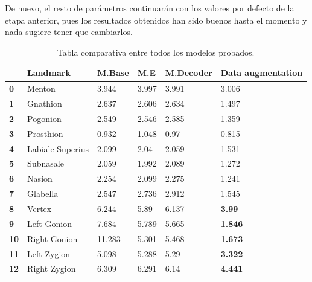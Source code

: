         \medskip

        \noindent De nuevo, el resto de parámetros continuarán con los valores por defecto de la etapa anterior, pues los resultados obtenidos han sido buenos hasta el momento y nada sugiere tener que cambiarlos.

        \begin{table}[!ht]
            \centering
            \caption{Tabla comparativa entre todos los modelos probados.}
            \begin{tabular}{|l|l|l|l|l|l|}
            \hline
                \textbf{} & \cellcolor{gray!25}\textbf{Landmark} & \cellcolor{gray!25}\textbf{M.Base} & \cellcolor{gray!25}\textbf{M.E} & \cellcolor{gray!25}\textbf{M.Decoder} & \cellcolor{gray!25}\textbf{Data augmentation} \\ \hline
                \textbf{0} & Menton & 3.944 & 3.997 & 3.991 & \cellcolor{green!25}3.006 \\ \hline
                \textbf{1} & Gnathion & 2.637 & 2.606 & 2.634 & \cellcolor{green!25}1.497 \\ \hline
                \textbf{2} & Pogonion & 2.549 & 2.546 & 2.585 & \cellcolor{green!25}1.359 \\ \hline
                \textbf{3} & Prosthion & 0.932 & 1.048 & 0.97 & \cellcolor{green!25}0.815 \\ \hline
                \textbf{4} & Labiale Superius & 2.099 & 2.04 & 2.059 & \cellcolor{green!25}1.531 \\ \hline
                \textbf{5} & Subnasale & 2.059 & 1.992 & 2.089 & \cellcolor{green!25}1.272 \\ \hline
                \textbf{6} & Nasion & 2.254 & 2.099 & 2.275 & \cellcolor{green!25}1.241 \\ \hline
                \textbf{7} & Glabella & 2.547 & 2.736 & 2.912 & \cellcolor{green!25}1.545 \\ \hline
                \textbf{8} & Vertex & 6.244 & 5.89 & 6.137 & \cellcolor{green!50}\textbf{3.99} \\ \hline
                \textbf{9} & Left Gonion & 7.684 & 5.789 & 5.665 & \cellcolor{green!50}\textbf{1.846} \\ \hline
                \textbf{10} & Right Gonion & 11.283 & 5.301 & 5.468 & \cellcolor{green!50}\textbf{1.673} \\ \hline
                \textbf{11} & Left Zygion & 5.098 & 5.288 & 5.29 & \cellcolor{green!50} \textbf{3.322} \\ \hline
                \textbf{12} & Right Zygion & 6.309 & 6.291 & 6.14 & \cellcolor{green!50} \textbf{4.441} \\ \hline

\end{tabular}
\end{table}
